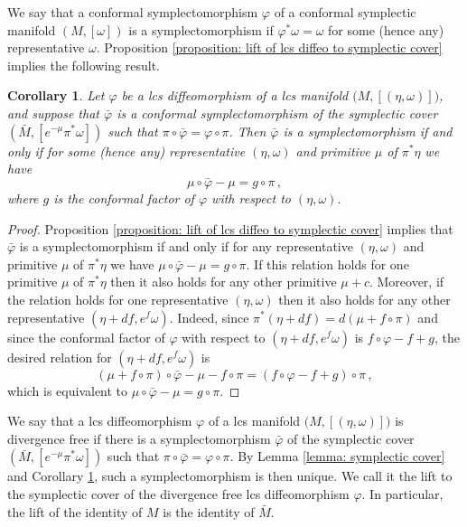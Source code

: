 \documentclass{amsart}
\newtheorem{cor}[thm]{Corollary}
\theoremstyle{remark}
\begin{document}
We say that a conformal symplectomorphism $\varphi$
of a conformal symplectic manifold $(M, [\omega])$
is a symplectomorphism
if $\varphi^{\ast}\omega = \omega$
for some (hence any) representative $\omega$.
Proposition \ref{proposition: lift of lcs diffeo to symplectic cover}
implies the following result.

\begin{cor}\label{corollary: symplectic lift}
Let $\varphi$ be a lcs diffeomorphism
of a lcs manifold $\big(M, [(\eta, \omega)]\big)$,
and suppose that $\bar{\varphi}$ is a conformal symplectomorphism
of the symplectic cover $(\bar{M}, [e^{-\mu} \pi^{\ast}\omega])$
such that $\pi \circ \bar{\varphi} = \varphi \circ \pi$.
Then $\bar{\varphi}$ is a symplectomorphism if and only if for some (hence any)
representative $(\eta, \omega)$
and primitive $\mu$ of $\pi^{\ast}\eta$
we have
\[
\mu \circ \bar{\varphi} - \mu = g \circ \pi \,,
\]
where $g$ is the conformal factor of $\varphi$
with respect to $(\eta, \omega)$.
\end{cor}

\begin{proof}
Proposition \ref{proposition: lift of lcs diffeo to symplectic cover}
implies that $\bar{\varphi}$ is a symplectomorphism
if and only if for any representative $(\eta, \omega)$
and primitive $\mu$ of $\pi^{\ast}\eta$
we have $\mu \circ \bar{\varphi} - \mu = g \circ \pi$.
If this relation holds for one primitive $\mu$ of $\pi^{\ast}\eta$
then it also holds for any other primitive $\mu + c$.
Moreover,
if the relation holds for one representative $(\eta, \omega)$
then it also holds for any other representative
$(\eta + d f , e^f \omega)$.
Indeed,
since $\pi^{\ast} (\eta + df) = d (\mu + f \circ \pi)$
and since the conformal factor of $\varphi$
with respect to $(\eta + df, e^f \omega)$
is $f \circ \varphi - f + g$,
the desired relation for $(\eta + df , e^f \omega)$
is
\[
(\mu + f \circ \pi ) \circ \bar{\varphi}
- \mu - f \circ \pi
= (f \circ \varphi - f + g) \circ \pi \,,
\]
which is equivalent to
$\mu \circ \bar{\varphi} - \mu = g \circ \pi$.
\end{proof}

We say that a lcs diffeomorphism $\varphi$
of a lcs manifold $\big(M, [(\eta, \omega)]\big)$
is divergence free
if there is a symplectomorphism $\bar{\varphi}$
of the symplectic cover $(\bar{M} , [e^{-\mu}\pi^{\ast}\omega])$
such that $\pi \circ \bar{\varphi} = \varphi \circ \pi$.
By Lemma \ref{lemma: symplectic cover}
and Corollary \ref{corollary: symplectic lift},
such a symplectomorphism is then unique.
We call it the lift to the symplectic cover
of the divergence free lcs diffeomorphism $\varphi$.
In particular,
the lift of the identity of $M$
is the identity of $\bar{M}$.
\end{document}
